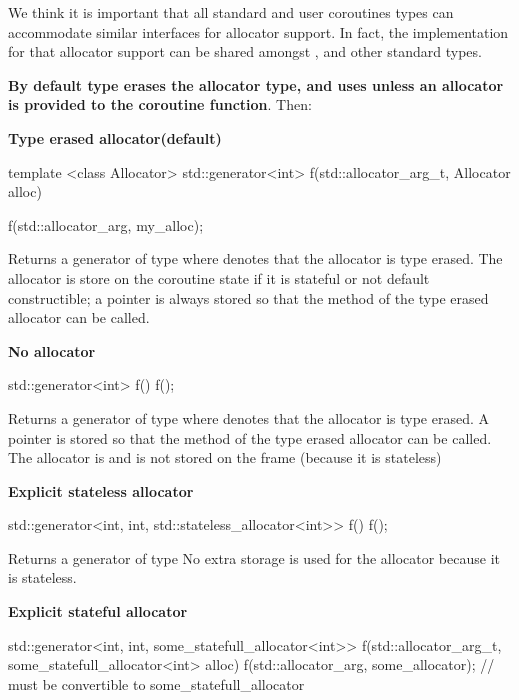 \documentclass{wg21}
\begin{document}
We think it is important that all standard and user coroutines types can accommodate similar interfaces for allocator support.
In fact, the implementation for that allocator support can be shared amongst ,  and other standard types.


\textbf{By default  type erases the allocator type, and uses  unless an allocator is provided to
the coroutine function}.
Then:

\textbf{Type erased allocator(default)}

\begin{colorblock}
template <class Allocator>
std::generator<int> f(std::allocator_arg_t, Allocator alloc) {}

f(std::allocator_arg, my_alloc{});
\end{colorblock}

Returns a generator of type  where  denotes that the allocator is type erased.
The allocator is store on the coroutine state if it is stateful or not default constructible; a pointer is always stored so that the  method of the type erased allocator can be called.


\textbf{No allocator}

\begin{colorblock}
std::generator<int> f() {}
f();
\end{colorblock}

Returns a generator of type  where  denotes that the allocator is type erased.
A pointer is stored so that the  method of the type erased allocator can be called. The allocator is  and is not stored on the frame (because it is stateless)

\textbf{Explicit stateless allocator}

\begin{colorblock}
std::generator<int, int, std::stateless_allocator<int>> f() {}
f();
\end{colorblock}

Returns a generator of type 
No extra storage is used for the allocator because it is stateless.

\textbf{Explicit stateful allocator}

\begin{colorblock}
std::generator<int, int, some_statefull_allocator<int>>
    f(std::allocator_arg_t,  some_statefull_allocator<int> alloc) {}
f(std::allocator_arg, some_allocator); // must be convertible to some_statefull_allocator
\end{colorblock}
\end{document}

